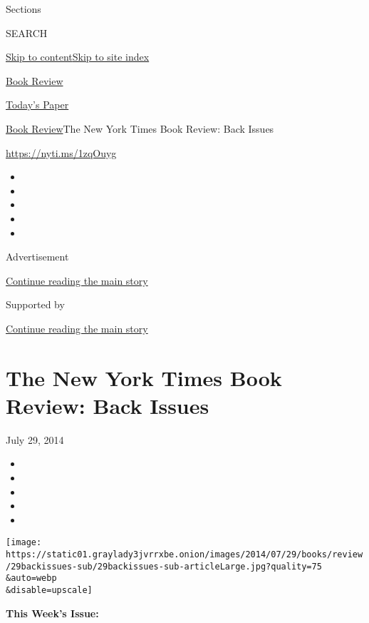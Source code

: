 Sections

SEARCH

\protect\hyperlink{site-content}{Skip to
content}\protect\hyperlink{site-index}{Skip to site index}

\href{https://www.nytimes3xbfgragh.onion/section/books/review}{Book
Review}

\href{https://myaccount.nytimes3xbfgragh.onion/auth/login?response_type=cookie\&client_id=vi}{}

\href{https://www.nytimes3xbfgragh.onion/section/todayspaper}{Today's
Paper}

\href{/section/books/review}{Book Review}\textbar{}The New York Times
Book Review: Back Issues

\url{https://nyti.ms/1zqOuyg}

\begin{itemize}
\item
\item
\item
\item
\item
\end{itemize}

Advertisement

\protect\hyperlink{after-top}{Continue reading the main story}

Supported by

\protect\hyperlink{after-sponsor}{Continue reading the main story}

\hypertarget{the-new-york-times-book-review-back-issues}{%
\section{The New York Times Book Review: Back
Issues}\label{the-new-york-times-book-review-back-issues}}

July 29, 2014

\begin{itemize}
\item
\item
\item
\item
\item
\end{itemize}

\texttt{[image: https://static01.graylady3jvrrxbe.onion/images/2014/07/29/books/review/29backissues-sub/29backissues-sub-articleLarge.jpg?quality=75\\\&auto=webp\\\&disable=upscale]}

\textbf{This Week's Issue:}

